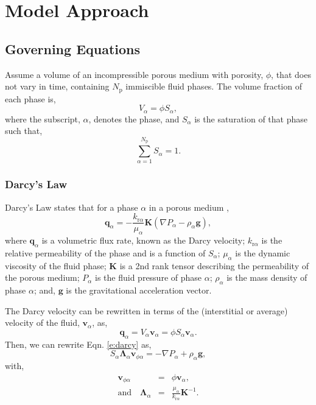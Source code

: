 
\section{Model Approach }

\subsection{Governing Equations}

Assume a volume of an incompressible porous medium with porosity, $\phi$, that does not vary in time, containing $N_\mathrm{p}$ immiscible fluid phases.  The volume fraction of each phase is,
\begin{equation}
V_\alpha = \phi S_\alpha,
\end{equation}
where the subscript, $\alpha$, denotes the phase, and $S_\alpha$ is the saturation of that phase such that,
\begin{equation}\label{e:total}
\sum_{\alpha=1}^{N_\mathrm{p}} S_\alpha = 1.
\end{equation}

\subsubsection{Darcy's Law}

Darcy's Law states that for a phase $\alpha$ in a porous medium \cite{bear_1972},
\begin{equation}\label{e:darcy}
\mathbf{q}_\alpha = -\frac{k_{\mathrm{r}\alpha}}{\mu_\alpha}\mathbf{K} \left( \nabla P_\alpha - \rho_\alpha \mathbf{g} \right),
\end{equation}
where $\mathbf{q}_\alpha$ is a volumetric flux rate, known as the Darcy velocity; $k_{\mathrm{r}\alpha}$ is the relative permeability of the phase and is a function of $S_\alpha$; $\mu_\alpha$ is the dynamic viscosity of the fluid phase; $\mathbf{K}$ is a 2nd rank tensor describing the permeability of the porous medium; $P_\alpha$ is the fluid pressure of phase $\alpha$; $\rho_\alpha$ is the mass density of phase $\alpha$; and, $\mathbf{g}$ is the gravitational acceleration vector.

The Darcy velocity can be rewritten in terms of the (interstitial or average) velocity of the fluid, $\mathbf{v}_\alpha$, as,
\begin{equation}
\mathbf{q}_\alpha = V_\alpha \mathbf{v}_\alpha = \phi S_\alpha \mathbf{v}_\alpha.
\end{equation}
Then, we can rewrite Eqn. \ref{e:darcy} as,
\begin{equation}\label{e:darcy2}
S_\alpha \mathbf{\Lambda}_\alpha \mathbf{v}_{\phi\alpha} = - \nabla P_\alpha + \rho_\alpha \mathbf{g},
\end{equation}
with,
\begin{eqnarray}
\mathbf{v}_{\phi\alpha} & = & \phi \mathbf{v}_\alpha,\\
\mathrm{and} \quad \mathbf{\Lambda}_\alpha & = & \frac{\mu_\alpha}{k_{\mathrm{r}\alpha}}\mathbf{K}^{-1}.\label{e:absorption}
\end{eqnarray}

